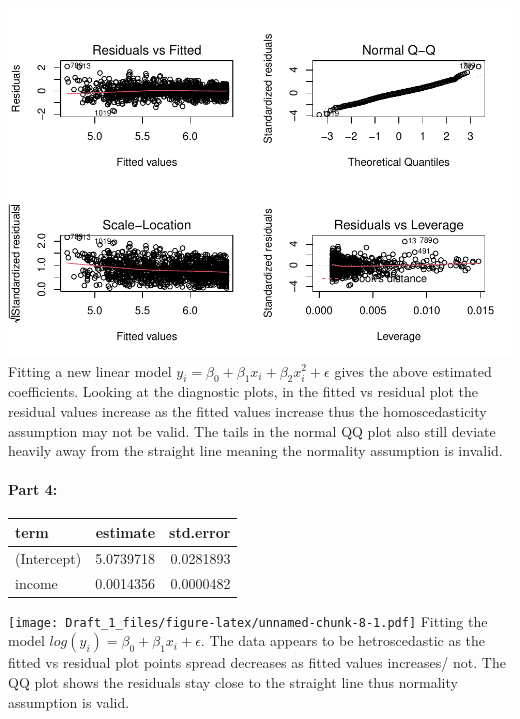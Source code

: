 \documentclass[
]{article}
\begin{document}
\includegraphics{Draft_1_files/figure-latex/unnamed-chunk-7-1.pdf}
Fitting a new linear model
\(y_{i}=\beta_{0}+\beta_{1}x_{i}+\beta_2x^2_{i}+\epsilon\) gives the
above estimated coefficients. Looking at the diagnostic plots, in the
fitted vs residual plot the residual values increase as the fitted
values increase thus the homoscedasticity assumption may not be valid.
The tails in the normal QQ plot also still deviate heavily away from the
straight line meaning the normality assumption is invalid.

\hypertarget{part-4}{%
\paragraph{Part 4:}\label{part-4}}

\begin{table}
\centering\begingroup\fontsize{15}{17}\selectfont

\begin{tabular}{l|r|r}
\hline
term & estimate & std.error\\
\hline
(Intercept) & 5.0739718 & 0.0281893\\
\hline
income & 0.0014356 & 0.0000482\\
\hline
\end{tabular}
\endgroup{}
\end{table}

\texttt{[image: Draft\_1\_files/figure-latex/unnamed-chunk-8-1.pdf]}
Fitting the model \(log(y_{i})=\beta_{0}+\beta_{1}x_{i}+\epsilon\). The
data appears to be hetroscedastic as the fitted vs residual plot points
spread decreases as fitted values increases/ not. The QQ plot shows the
residuals stay close to the straight line thus normality assumption is
valid.
\end{document}

